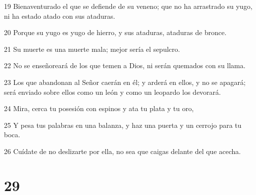 \par 19 Bienaventurado el que se defiende de su veneno; que no ha arrastrado su yugo, ni ha estado atado con sus ataduras.
\par 20 Porque su yugo es yugo de hierro, y sus ataduras, ataduras de bronce.
\par 21 Su muerte es una muerte mala; mejor sería el sepulcro.
\par 22 No se enseñoreará de los que temen a Dios, ni serán quemados con su llama.
\par 23 Los que abandonan al Señor caerán en él; y arderá en ellos, y no se apagará; será enviado sobre ellos como un león y como un leopardo los devorará.
\par 24 Mira, cerca tu posesión con espinos y ata tu plata y tu oro,
\par 25 Y pesa tus palabras en una balanza, y haz una puerta y un cerrojo para tu boca.
\par 26 Cuídate de no deslizarte por ella, no sea que caigas delante del que acecha.

\chapter{29}

